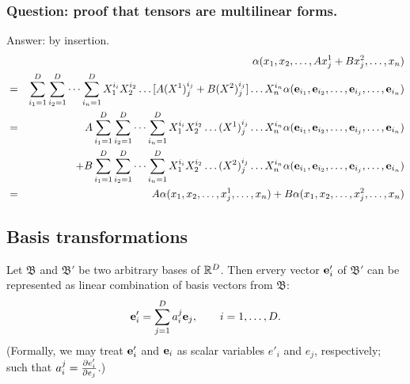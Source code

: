 \subsubsection{Question: proof that tensors are multilinear forms.}
{Answer:}
by insertion.
\begin{eqnarray}
&&\alpha ( x_1,x_2,\ldots , Ax^1_j+Bx_j^2,\ldots ,x_n)
\nonumber \\
&=&
\sum_{i_1=1}^D
\sum_{i_2=1}^D
\cdots
\sum_{i_n=1}^D
X^{i_i}_1X^{i_2}_2\ldots  [A(X^1)^{i_j}_j+B(X^2)^{i_j}_j]\ldots X^{i_n}_n
\alpha ( {\bf e}_{i_1},{\bf e}_{i_2},\ldots,{\bf e}_{i_j},\ldots ,{\bf e}_{i_n})
\nonumber \\
&=& A
\sum_{i_1=1}^D
\sum_{i_2=1}^D
\cdots
\sum_{i_n=1}^D
X^{i_i}_1X^{i_2}_2\ldots  (X^1)^{i_j}_j\ldots X^{i_n}_n
\alpha ( {\bf e}_{i_1},{\bf e}_{i_2},\ldots,{\bf e}_{i_j},\ldots ,{\bf e}_{i_n})
\nonumber \\
&&\quad +
B
\sum_{i_1=1}^D
\sum_{i_2=1}^D
\cdots
\sum_{i_n=1}^D
X^{i_i}_1X^{i_2}_2\ldots  (X^2)^{i_j}_j\ldots X^{i_n}_n
\alpha ( {\bf e}_{i_1},{\bf e}_{i_2},\ldots,{\bf e}_{i_j},\ldots ,{\bf e}_{i_n})
\nonumber \\
&=& A \alpha ( x_1,x_2,\ldots , x^1_j,\ldots ,x_n)+
B \alpha ( x_1,x_2,\ldots , x_j^2,\ldots ,x_n)\nonumber
\end{eqnarray}

\subsection{Basis transformations}
Let
${\mathfrak B}$
and
${\mathfrak B'}$
be two arbitrary bases of
${\Bbb R}^D$.
Then ervery vector ${\bf e}'_i$ of
${\mathfrak B'}$
can be represented as linear combination of basis vectors from
${\mathfrak B}$:
\begin{equation}
{\bf e}'_i=\sum_{j=1}^D a_i^j {\bf e}_j, \qquad i=1,\ldots , D  .
\label{2001-mu-tensors}
\end{equation}
(Formally, we may treat  ${\bf e}'_i$ and ${\bf e}_i$
as scalar variables $e'_i$ and $e_j$, respectively; such that
$
a_i^j ={\partial { e}'_i \over \partial { e}_j}
$.)


